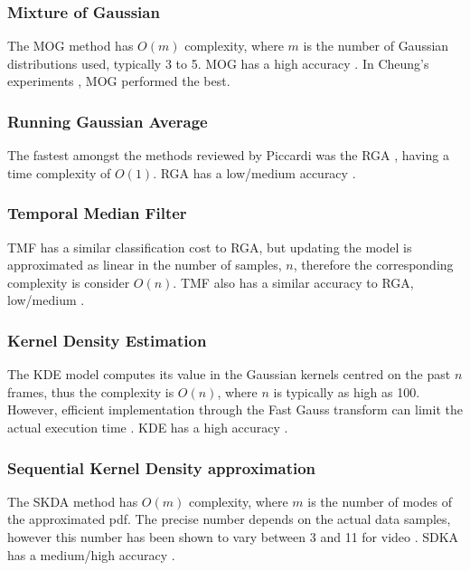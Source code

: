 \subsubsection{Mixture of Gaussian}
The MOG method \cite{Stauffer1999} has $O(m)$ complexity, where $m$ is the number of Gaussian distributions used, typically 3 to 5. MOG has a high accuracy \cite{Piccardi2004}. In Cheung's experiments \cite{Cheung2007}, MOG performed the best.\\

\subsubsection{Running Gaussian Average}
The fastest amongst the methods reviewed by Piccardi was the RGA \cite{Wren1997,Koller1994}, having a time complexity of $O(1)$. RGA has a low/medium accuracy \cite{Piccardi2004}.\\

\subsubsection{Temporal Median Filter}
TMF \cite{Lo2001,Cucchiara2003} has a similar classification cost to RGA, but updating the  model is approximated as linear in the number of samples, $n$, therefore the corresponding complexity is consider $O(n)$. TMF also has a similar accuracy to RGA, low/medium \cite{Piccardi2004}.\\

\subsubsection{Kernel Density Estimation}
The KDE \cite{Elgammal2000} model computes its value in the Gaussian kernels centred on the past $n$ frames, thus the complexity is $O(n)$, where $n$ is typically as high as 100. However, efficient implementation through the Fast Gauss transform can limit the actual execution time \cite{Elgammal2003}. KDE has a high accuracy \cite{Piccardi2004}.\\

\subsubsection{Sequential Kernel Density approximation}
The SKDA \cite{Han2004} method has $O(m)$ complexity, where $m$ is the number of modes of
the approximated pdf. 
The precise number depends on the actual data samples, however this number has been shown to vary between 3 and 11 for video \cite{Han2007}. SDKA has a medium/high accuracy \cite{Piccardi2004}.

